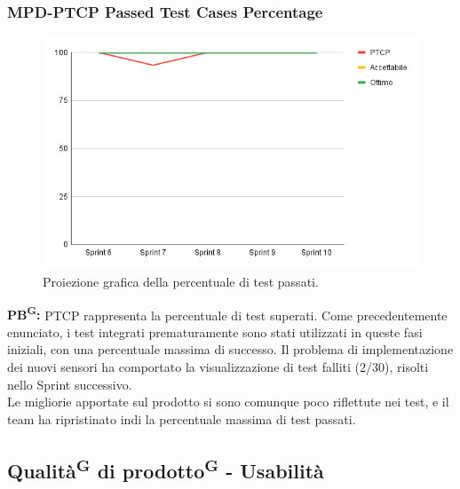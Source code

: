 \documentclass[8pt]{article}
\newcommand{\glossterm}[1]{#1\textsuperscript{G}} %
\begin{document}
\subsubsection{MPD-PTCP Passed Test Cases Percentage}
\begin{figure}[h!]
    \centering
    \includegraphics[width=1\textwidth]{images_pdq/PTCP.png}
    \caption{Proiezione grafica della percentuale di test passati.}
    \label{fig:Proiezione grafica della percentuale di test passati}
\end{figure}
\textbf{\glossterm{PB}:} PTCP rappresenta la percentuale di test superati. Come precedentemente enunciato, i test integrati prematuramente sono stati utilizzati in queste fasi iniziali, con una percentuale massima di successo. Il problema di implementazione dei nuovi sensori ha comportato la visualizzazione di test falliti (2/30), risolti nello Sprint successivo.\\Le migliorie apportate sul prodotto si sono comunque poco riflettute nei test, e il team ha ripristinato indi la percentuale massima di test passati.
\clearpage
\subsection{\glossterm{Qualità} di \glossterm{prodotto} - Usabilità}
\end{document}
